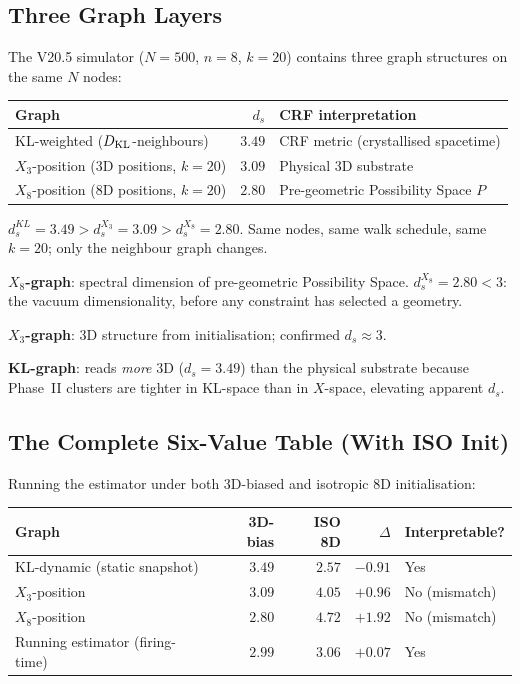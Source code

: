 \documentclass[12pt, a4paper]{article}
\begin{document}
\subsection{Three Graph Layers}

The V20.5 simulator ($N=500$, $n=8$, $k=20$) contains three graph structures on the same $N$ nodes:

\begin{center}
\renewcommand{\arraystretch}{1.5}
\begin{tabular}{lrl}
\toprule
Graph & $d_s$ & CRF interpretation\\
\midrule
KL-weighted ($D_{\rm KL}$-neighbours) & $3.49$ & CRF metric (crystallised spacetime)\\
$X_3$-position (3D positions, $k=20$) & $3.09$ & Physical 3D substrate\\
$X_8$-position (8D positions, $k=20$) & $2.80$ & Pre-geometric Possibility Space $P$\\
\bottomrule
\end{tabular}
\end{center}

\begin{derivedbox}[title={Three-Graph $d_s$ Measurement (Confirmed)}]
$d_s^{KL}=3.49 > d_s^{X_3}=3.09 > d_s^{X_8}=2.80$. Same nodes, same walk schedule, same $k=20$; only the neighbour graph changes.

\textbf{$X_8$-graph}: spectral dimension of pre-geometric Possibility Space. $d_s^{X_8}=2.80<3$: the vacuum dimensionality, before any constraint has selected a geometry.

\textbf{$X_3$-graph}: 3D structure from initialisation; confirmed $d_s\approx 3$.

\textbf{KL-graph}: reads \emph{more} 3D ($d_s=3.49$) than the physical substrate because Phase~II clusters are tighter in KL-space than in $X$-space, elevating apparent $d_s$.
\end{derivedbox}

\subsection{The Complete Six-Value Table (With ISO Init)}

Running the estimator under both 3D-biased and isotropic 8D initialisation:

\begin{center}
\renewcommand{\arraystretch}{1.5}
\begin{tabular}{p{6.2cm}rrrl}
\toprule
Graph & 3D-bias & ISO 8D & $\Delta$ & Interpretable?\\
\midrule
KL-dynamic (static snapshot) & $3.49$ & $2.57$ & $-0.91$ & Yes\\
$X_3$-position & $3.09$ & $4.05$ & $+0.96$ & No (mismatch)\\
$X_8$-position & $2.80$ & $4.72$ & $+1.92$ & No (mismatch)\\
Running estimator (firing-time) & $2.99$ & $3.06$ & $+0.07$ & Yes\\
\bottomrule
\end{tabular}
\end{center}
\end{document}
